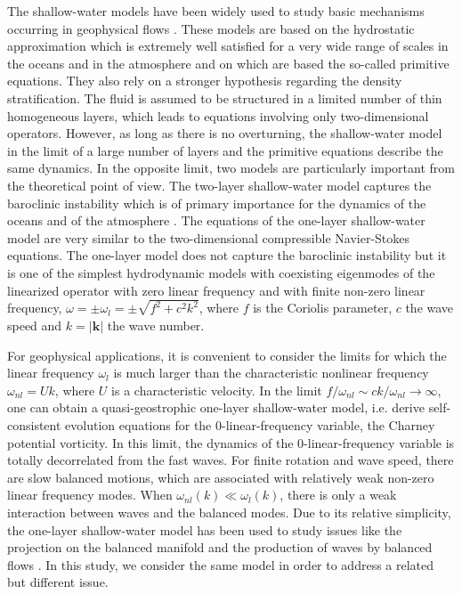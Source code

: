 \documentclass{jfm}
\newcommand{\kk}{\textbf{k}}
\newcommand{\Add}[1]{{\color{blue}#1}}
\begin{document}
The shallow-water models have been widely used to study basic
mechanisms occurring in geophysical flows \cite[see for
example][]{VallisLIVRE2006}.
%
These models are based on the hydrostatic approximation which is
extremely well satisfied for a very wide range of scales in the oceans
and in the atmosphere \Add{and on which are based the so-called
primitive equations}.  They also rely on a stronger hypothesis
regarding the density stratification.  The fluid is assumed to be
structured in a limited number of thin homogeneous layers, which leads
to equations involving only two-dimensional operators. \Add{However,
as long as there is no overturning, the shallow-water model in the
limit of a large number of layers and the primitive equations describe
the same dynamics. In the opposite limit, two models are particularly
important from the theoretical point of view.} The two-layer
shallow-water model captures the baroclinic instability which is of
primary importance for the dynamics of the oceans and of the
atmosphere \cite[]{VallisLIVRE2006, Wirth2013}.
%
The equations of the one-layer shallow-water model are very similar to
the two-dimensional compressible Navier-Stokes equations.  The
one-layer model does not capture the baroclinic instability but it is
one of the simplest hydrodynamic models with coexisting eigenmodes of
the linearized operator with zero linear frequency and with finite
non-zero linear frequency, $\omega = \pm \omega_l = \pm\sqrt{f^2 + c^2
k^2}$, where $f$ is the Coriolis parameter, $c$ the wave speed and $k
= |\kk|$ the wave number.
%

For geophysical applications, it is convenient to consider the limits
for which the linear frequency $\omega_{l}$ is much larger than the
characteristic nonlinear frequency $\omega_{nl} = U k$, where $U$ is a
characteristic velocity.  In the limit $f/\omega_{nl} \sim
ck/\omega_{nl} \rightarrow \infty$, one can obtain a quasi-geostrophic
one-layer shallow-water model, i.e. derive self-consistent evolution
equations for the 0-linear-frequency variable, the Charney potential
vorticity.  In this limit, the dynamics of the 0-linear-frequency
variable is totally decorrelated from the fast waves.
%
For finite rotation and wave speed, there are slow balanced motions,
which are associated with relatively weak non-zero linear frequency
modes.
%
When $\omega_{nl}(k) \ll \omega_{l}(k) $, there is only a weak
interaction between waves and the balanced modes.
%
Due to its relative simplicity, the one-layer shallow-water model has
been used to study issues like the projection on the balanced manifold
\cite[]{Lorenz1980, MohebalhojehDritschel2000} and the production of
waves by balanced flows \cite[]{FargeSadourny1989,
LahayeZeitlin2012,Vanneste2013}. \Add{In this study, we consider the
same model in order to address a related but different issue.}
\end{document}
